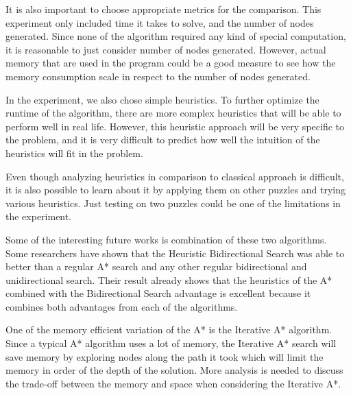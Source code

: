 \documentclass[conference]{IEEEtran}
\begin{document}
It is also important to choose appropriate metrics for the comparison. This experiment only included time it takes to solve, and the number of nodes generated. Since none of the algorithm required any kind of special computation, it is reasonable to just consider number of nodes generated. However, actual memory that are used in the program could be a good measure to see how the memory consumption scale in respect to the number of nodes generated.

In the experiment, we also chose simple heuristics. To further optimize the runtime of the algorithm, there are more complex heuristics that will be able to perform well in real life. However, this heuristic approach will be very specific to the problem, and it is very difficult to predict how well the intuition of the heuristics will fit in the problem.

Even though analyzing heuristics in comparison to classical approach is difficult, it is also possible to learn about it by applying them on other puzzles and trying various heuristics. Just testing on two puzzles could be one of the limitations in the experiment.

Some of the interesting future works is combination of these two algorithms. Some researchers have shown that the Heuristic Bidirectional Search was able to better than a regular A* search and any other regular bidirectional and unidirectional search.\cite{Kaindl} Their result already shows that the heuristics of the A* combined with the Bidirectional Search advantage is excellent because it combines both advantages from each of the algorithms.

One of the memory efficient variation of the A* is the Iterative A* algorithm. Since a typical A* algorithm uses a lot of memory, the Iterative A* search will save memory by exploring nodes along the path it took which will limit the memory in order of the depth of the solution. More analysis is needed to discuss the trade-off between the memory and space when considering the Iterative A*.






\end{document}
